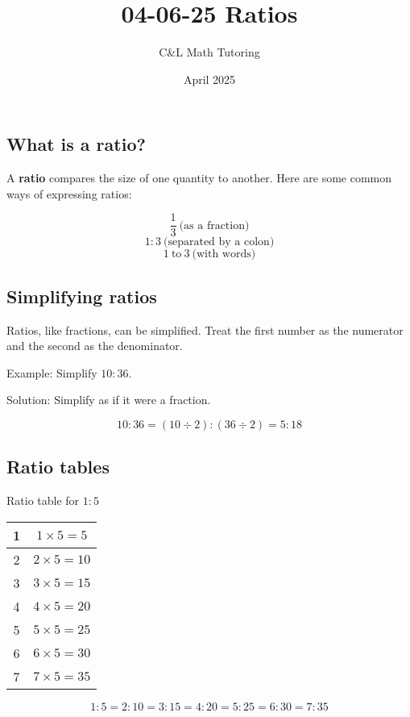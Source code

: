\documentclass[a4paper, 12pt]{article}
\title{04-06-25 Ratios}
\author{C\&L Math Tutoring}
\date{April 2025}
\begin{document}
\maketitle

\subsection*{What is a ratio?}
A \textbf{ratio} compares the size of one quantity to another. Here are some common ways of expressing ratios:

$$\frac{1}{3} \: \text{(as a fraction)}$$
$$1:3 \: \text{(separated by a colon)}$$
$$1 \: \text{to} \: 3 \: \text{(with words)}$$

\subsection*{Simplifying ratios}
Ratios, like fractions, can be simplified. Treat the first number as the numerator and the second as the denominator.

Example: Simplify $10:36$.

Solution: Simplify as if it were a fraction.

$$10:36 = (10 \div 2) : (36 \div 2) = \boxed{5 : 18}$$

\subsection*{Ratio tables}
Ratio table for $1:5$

\begin{table}[H]
\centering
  \begin{tabular}{|c|c|}
  \hline
  1 & $1 \times 5 = 5$ \\\hline
  2 & $ 2 \times 5 = 10$ \\\hline
  3 & $3 \times 5 = 15$ \\\hline
  4 & $4 \times 5 = 20$ \\\hline
  5 & $ 5 \times 5 = 25$ \\\hline
  6 & $ 6 \times 5 = 30$ \\\hline
  7 & $ 7 \times 5 = 35$ \\\hline
  \end{tabular}
\end{table}

$$ 1:5 = 2:10 = 3:15 = 4:20 = 5:25 = 6:30 = 7:35 $$
\end{document}
